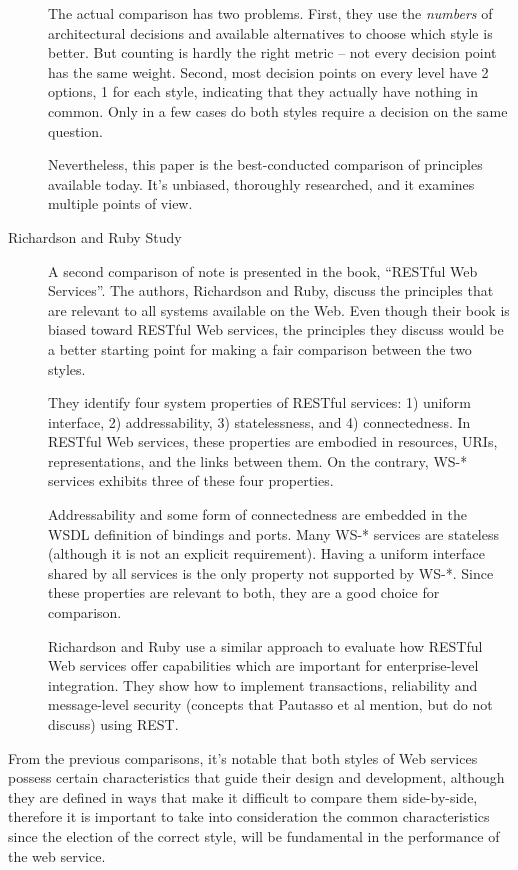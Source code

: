 \begin{description}
The actual comparison has two problems. First, they use the \emph{numbers} of architectural decisions and available alternatives to choose which style is better. But counting is hardly the right metric -- not every decision point has the same weight. Second, most decision points on every level have 2 options, 1 for each style, indicating that they actually have nothing in common. Only in a few cases do both styles require a decision on the same question. 

Nevertheless, this paper is the best-conducted comparison of principles available today. It's unbiased, thoroughly researched, and it examines multiple points of view.

\item[Richardson and Ruby Study] A second comparison of note is presented in the book, ``RESTful Web Services''\cite{RichardsonRuby:2007}. The authors, Richardson and Ruby, discuss the principles that are relevant to all systems available on the Web. Even though their book is biased toward RESTful Web services, the principles they discuss would be a better starting point for making a fair comparison between the two styles.

They identify four system properties of RESTful services: 1) uniform interface, 2) addressability, 3) statelessness, and 4) connectedness. In RESTful Web services, these properties are embodied in resources, URIs, representations, and the links between them. On the contrary, WS-* services exhibits three of these four properties.

Addressability and some form of connectedness are embedded in the WSDL definition of bindings and ports. Many WS-* services are stateless (although it is not an explicit requirement). Having a uniform interface shared by all services is the only property not supported by WS-*. Since these properties are relevant to both, they are a good choice for comparison.

Richardson and Ruby use a similar approach to evaluate how RESTful Web services offer capabilities which are important for enterprise-level integration. They show how to implement transactions, reliability and message-level security (concepts that Pautasso et al mention, but do not discuss) using REST.
\end{description}

From the previous comparisons, it's notable that both styles of Web services possess certain characteristics that guide their design and development, although they are defined in ways that make it difficult to compare them side-by-side, therefore it is important to take into consideration the common characteristics since the election of the correct style, will be fundamental in the performance of the web service.


